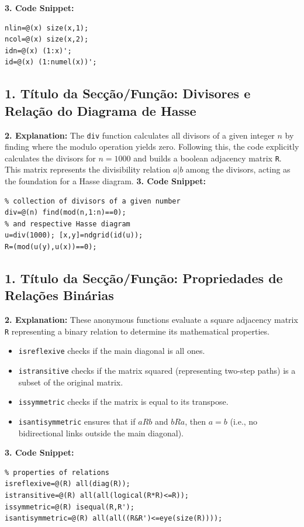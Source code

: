 \textbf{3. Code Snippet:}
\begin{lstlisting}
nlin=@(x) size(x,1);
ncol=@(x) size(x,2);
idn=@(x) (1:x)';
id=@(x) (1:numel(x))';
\end{lstlisting}

\subsection{1. Título da Secção/Função: Divisores e Relação do Diagrama de Hasse}
\textbf{2. Explanation:} The \texttt{div} function calculates all divisors of a given integer $n$ by finding where the modulo operation yields zero. Following this, the code explicitly calculates the divisors for $n=1000$ and builds a boolean adjacency matrix \texttt{R}. This matrix represents the divisibility relation $a|b$ among the divisors, acting as the foundation for a Hasse diagram. 
\textbf{3. Code Snippet:}
\begin{lstlisting}
% collection of divisors of a given number
div=@(n) find(mod(n,1:n)==0);
% and respective Hasse diagram
u=div(1000); [x,y]=ndgrid(id(u));
R=(mod(u(y),u(x))==0); 
\end{lstlisting}

\subsection{1. Título da Secção/Função: Propriedades de Relações Binárias}
\textbf{2. Explanation:} These anonymous functions evaluate a square adjacency matrix \texttt{R} representing a binary relation to determine its mathematical properties. 
\begin{itemize}
    \item \texttt{isreflexive} checks if the main diagonal is all ones.
    \item \texttt{istransitive} checks if the matrix squared (representing two-step paths) is a subset of the original matrix.
    \item \texttt{issymmetric} checks if the matrix is equal to its transpose.
    \item \texttt{isantisymmetric} ensures that if $aRb$ and $bRa$, then $a=b$ (i.e., no bidirectional links outside the main diagonal).
\end{itemize}

\textbf{3. Code Snippet:}
\begin{lstlisting}
% properties of relations
isreflexive=@(R) all(diag(R));
istransitive=@(R) all(all(logical(R*R)<=R));
issymmetric=@(R) isequal(R,R');
isantisymmetric=@(R) all(all((R&R')<=eye(size(R))));
\end{lstlisting}

